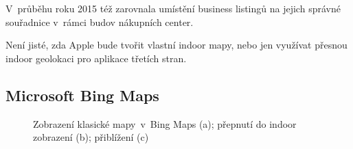 V~průběhu roku 2015 též zarovnala umístění business listingů na jejich správné souřadnice v~rámci budov nákupních center\cite{zdroj19}.~

Není jisté, zda Apple bude tvořit vlastní indoor mapy, nebo jen využívat přesnou indoor geolokaci pro aplikace třetích stran\cite{zdroj20}.

\subsection{Microsoft Bing Maps}\label{microsoft-bing-maps}


                      \begin{figure}
                    	  \centering
                    \hfill
                    \hfill

                    \caption{Zobrazení klasické mapy~v~Bing Maps (a); přepnutí do indoor zobrazení (b); přiblížení (c)}
                    \label{obr4}
                    \end{figure}
                    

